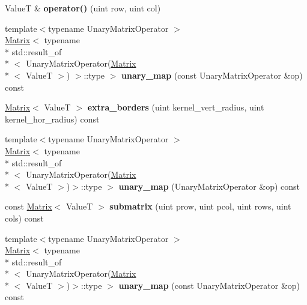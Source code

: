 \begin{DoxyCompactItemize}
\item 
\hypertarget{class_matrix_ac2b447e7fa2b5b8e03f76532628dd8ca}{Value\-T \& {\bfseries operator()} (uint row, uint col)}\label{class_matrix_ac2b447e7fa2b5b8e03f76532628dd8ca}

\item 
\hypertarget{class_matrix_aead44f189ff78d6639c229964f86a515}{{\footnotesize template$<$typename Unary\-Matrix\-Operator $>$ }\\\hyperlink{class_matrix}{Matrix}$<$ typename \\*
std\-::result\-\_\-of\\*
$<$ Unary\-Matrix\-Operator(\hyperlink{class_matrix}{Matrix}\\*
$<$ Value\-T $>$) $>$\-::type $>$ {\bfseries unary\-\_\-map} (const Unary\-Matrix\-Operator \&op) const }\label{class_matrix_aead44f189ff78d6639c229964f86a515}

\item 
\hypertarget{class_matrix_a9e43788842d46e31127c6a5cd97257ac}{\hyperlink{class_matrix}{Matrix}$<$ Value\-T $>$ {\bfseries extra\-\_\-borders} (uint kernel\-\_\-vert\-\_\-radius, uint kernel\-\_\-hor\-\_\-radius) const }\label{class_matrix_a9e43788842d46e31127c6a5cd97257ac}

\item 
\hypertarget{class_matrix_a6ac372779b4e6fe7da696a5091a89f3a}{{\footnotesize template$<$typename Unary\-Matrix\-Operator $>$ }\\\hyperlink{class_matrix}{Matrix}$<$ typename \\*
std\-::result\-\_\-of\\*
$<$ Unary\-Matrix\-Operator(\hyperlink{class_matrix}{Matrix}\\*
$<$ Value\-T $>$)$>$\-::type $>$ {\bfseries unary\-\_\-map} (Unary\-Matrix\-Operator \&op) const }\label{class_matrix_a6ac372779b4e6fe7da696a5091a89f3a}

\item 
\hypertarget{class_matrix_a5fe7259222a448b7fb400e158795e242}{const \hyperlink{class_matrix}{Matrix}$<$ Value\-T $>$ {\bfseries submatrix} (uint prow, uint pcol, uint rows, uint cols) const }\label{class_matrix_a5fe7259222a448b7fb400e158795e242}

\item 
\hypertarget{class_matrix_a3cc0fa1a8a693ba129078816e1b2a51c}{{\footnotesize template$<$typename Unary\-Matrix\-Operator $>$ }\\\hyperlink{class_matrix}{Matrix}$<$ typename \\*
std\-::result\-\_\-of\\*
$<$ Unary\-Matrix\-Operator(\hyperlink{class_matrix}{Matrix}\\*
$<$ Value\-T $>$)$>$\-::type $>$ {\bfseries unary\-\_\-map} (const Unary\-Matrix\-Operator \&op) const }\label{class_matrix_a3cc0fa1a8a693ba129078816e1b2a51c}

\end{DoxyCompactItemize}
